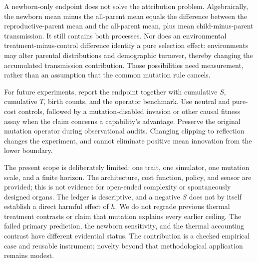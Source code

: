 \documentclass[10pt]{article}
\begin{document}
A newborn-only endpoint does not solve the attribution problem. Algebraically, the newborn mean minus the all-parent mean equals the difference between the reproductive-parent mean and the all-parent mean, plus mean child-minus-parent transmission. It still contains both processes. Nor does an environmental treatment-minus-control difference identify a pure selection effect: environments may alter parental distributions and demographic turnover, thereby changing the accumulated transmission contribution. Those possibilities need measurement, rather than an assumption that the common mutation rule cancels.

For future experiments, report the endpoint together with cumulative $S$, cumulative $T$, birth counts, and the operator benchmark. Use neutral and pure-cost controls, followed by a mutation-disabled invasion or other causal fitness assay when the claim concerns a capability's advantage. Preserve the original mutation operator during observational audits. Changing clipping to reflection changes the experiment, and cannot eliminate positive mean innovation from the lower boundary.

The present scope is deliberately limited: one trait, one simulator, one mutation scale, and a finite horizon. The architecture, cost function, policy, and sensor are provided; this is not evidence for open-ended complexity or spontaneously designed organs. The ledger is descriptive, and a negative $S$ does not by itself establish a direct harmful effect of $h$. We do not regrade previous thermal treatment contrasts or claim that mutation explains every earlier ceiling. The failed primary prediction, the newborn sensitivity, and the thermal accounting contrast have different evidential status. The contribution is a checked empirical case and reusable instrument; novelty beyond that methodological application remains modest.
\end{document}
